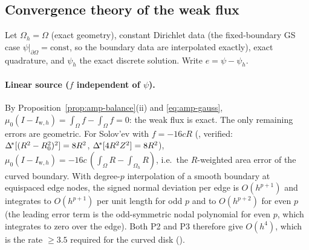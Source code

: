 \subsection{Convergence theory of the weak flux}
Let $\Omega_h=\Omega$ (exact geometry), constant Dirichlet data (the
fixed-boundary GS case $\psi|_{\partial\Omega}=\mathrm{const}$, so the boundary
data are interpolated exactly), exact quadrature, and $\psi_h$ the exact
discrete solution. Write $e=\psi-\psi_h$.

\paragraph{Linear source ($f$ independent of $\psi$).} By
Proposition~\ref{prop:amp-balance}(ii) and \eqref{eq:amp-gauss},
$\mu_0(I-I_{\mathrm w,h})=\int_\Omega f-\int_\Omega f=0$: the weak flux is exact.
The only remaining errors are geometric. For Solov'ev with $f=-16cR$
(, verified:
$\Delta^{\!*}[(R^2-R_0^2)^2]=8R^2$, $\Delta^{\!*}[4R^2Z^2]=8R^2$),
$\mu_0(I-I_{\mathrm w,h})=-16c\,(\int_\Omega R-\int_{\Omega_h}R)$, i.e.\ the
$R$-weighted area error of the curved boundary. With degree-$p$ interpolation of
a smooth boundary at equispaced edge nodes, the signed normal deviation per edge
is $O(h^{p+1})$ and integrates to $O(h^{p+1})$ per unit length for odd $p$ and
to $O(h^{p+2})$ for even $p$ (the leading error term is the odd-symmetric nodal
polynomial for even $p$, which integrates to zero over the edge). Both P2 and P3
therefore give $O(h^4)$, which is the rate $\ge3.5$ required for the curved
disk ().

